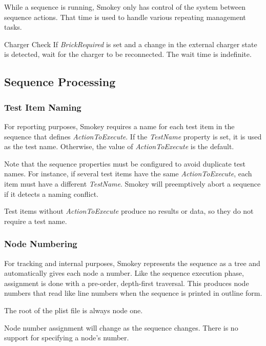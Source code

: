 \documentclass[11pt]{article}
\newcommand{\prop}[1]{{\itshape#1}}
\begin{document}
While a sequence is running, Smokey only has control of the system between
sequence actions.  That time is used to handle various repeating management
tasks.

\begin{Definition}

\item[Charger Check] If \prop{BrickRequired} is set and a change in the external
	charger state is detected, wait for the charger to be reconnected.
	The wait time is indefinite.

\end{Definition}

\subsection{Sequence Processing}

\subsubsection{Test Item Naming}

For reporting purposes, Smokey requires a name for each test item in the
sequence that defines \prop{ActionToExecute}.  If the \prop{TestName} property is set, it is
used as the test name.  Otherwise, the value of \prop{ActionToExecute} is the default.

Note that the sequence properties must be configured to avoid duplicate test
names.  For instance, if several test items have the same \prop{ActionToExecute}, each
item must have a different \prop{TestName}.  Smokey will preemptively abort a sequence
if it detects a naming conflict.

Test items without \prop{ActionToExecute} produce no results or data, so they do not
require a test name.

\subsubsection{Node Numbering}

For tracking and internal purposes, Smokey represents the sequence as a tree
and automatically gives each node a number.  Like the sequence execution phase,
assignment is done with a pre-order, depth-first traversal.  This produces node
numbers that read like line numbers when the sequence is printed in outline
form.

The root of the plist file is always node one.

Node number assignment will change as the sequence changes.  There is no
support for specifying a node's number.
\end{document}
